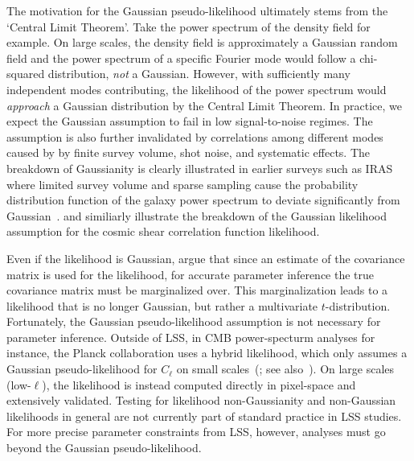 \documentclass[12pt, letterpaper, preprint]{aastex6}
\newcommand{\lss}{{\small{LSS}}\xspace}
\begin{document}
The motivation for the Gaussian pseudo-likelihood ultimately stems 
from the `Central Limit Theorem'. Take the power spectrum of the density 
field for example. On large scales, the density field is approximately a 
Gaussian random field and the power spectrum of a specific Fourier 
mode would follow a chi-squared distribution, \emph{not} a Gaussian. 
However, with sufficiently many independent modes contributing, the likelihood
of the power spectrum would \emph{approach} a Gaussian distribution by the Central 
Limit Theorem. In practice, we expect the Gaussian assumption 
to fail in low signal-to-noise regimes. The assumption is also further
invalidated by correlations among different modes caused by 
by finite survey volume, shot noise, and systematic effects.
The breakdown of Gaussianity is clearly illustrated in earlier 
surveys such as IRAS where limited survey volume and sparse sampling cause the 
probability distribution function of the galaxy power spectrum to deviate 
significantly from Gaussian~\citep[see Figure 9 in][]{scoccimarro2000}. 
\cite{hartlap2009} and \cite{sellentin2017} similiarly illustrate the breakdown
of the Gaussian likelihood assumption for the cosmic shear correlation function 
likelihood.

Even if the likelihood is Gaussian, \cite{sellentin2016} argue that 
since an estimate of the covariance matrix is used for the likelihood, 
for accurate parameter inference the true covariance matrix must be marginalized over. 
This marginalization leads to a likelihood that is no longer Gaussian, but rather a 
multivariate $t$-distribution. Fortunately, the Gaussian pseudo-likelihood 
assumption is not necessary for parameter inference. Outside of \lss, in CMB 
power-specturm analyses for instance, the Planck collaboration 
uses a hybrid likelihood, which only assumes a Gaussian pseudo-likelihood 
for $C_\ell$ on small scales~(\citealt{ade2014,aghanim2016}; see 
also~\citealt{efstathiou2004, efstathiou2006}). On large scales (low-$\ell$), 
the likelihood is instead computed directly in pixel-space and extensively 
validated. Testing for likelihood non-Gaussianity and non-Gaussian likelihoods 
in general are not currently part of standard practice in \lss studies. For 
more precise parameter constraints from LSS, however, analyses must go beyond the
Gaussian pseudo-likelihood.
\end{document}
